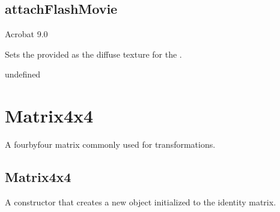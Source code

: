 \documentclass[letterpaper,12pt,english,openany,oneside]{sphinxmanual}
\begin{document}
\label{\detokenize{JS_3D_API:properties-14}}


\subsection{attachFlashMovie}
\label{\detokenize{JS_3D_API:attachflashmovie}}
Acrobat 9.0

Sets the provided  as the diffuse texture for the .

\label{\detokenize{JS_3D_API:syntax-35}}

\begin{sphinxVerbatim}[commandchars=\\\{\}]
\end{sphinxVerbatim}
\label{\detokenize{JS_3D_API:parameters-23}}

\label{\detokenize{JS_3D_API:section-41}}\label{\detokenize{JS_3D_API:returns-35}}

undefined


\section{Matrix4x4}
\label{\detokenize{JS_3D_API:matrix4x4}}
A four\sphinxhyphen{}by\sphinxhyphen{}four matrix commonly used for transformations.

\label{\detokenize{JS_3D_API:properties-15}}


\subsection{Matrix4x4}
\label{\detokenize{JS_3D_API:matrix4x4-1}}\label{\detokenize{JS_3D_API:id11}}
A constructor that creates a new  object initialized to the identity matrix.

\label{\detokenize{JS_3D_API:syntax-36}}

\begin{sphinxVerbatim}[commandchars=\\\{\}]
 
\end{sphinxVerbatim}
\label{\detokenize{JS_3D_API:returns-36}}
\end{document}
